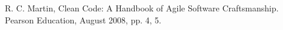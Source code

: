 \documentclass[11pt,conference]{IEEEtran}
\begin{document}
%
\begin{thebibliography}{00}
   R. C. Martin, Clean Code: A Handbook of Agile Software Craftsmanship. Pearson Education, August 2008, pp. 4, 5.
\end{thebibliography}
\end{document}
